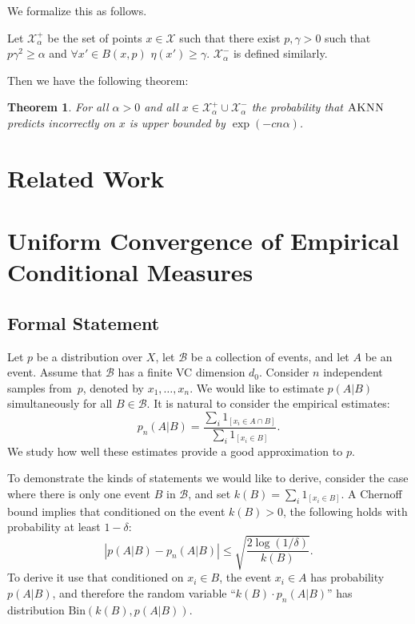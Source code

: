 \documentclass{article}
\def\X{{\mathcal X}}
\def\B{{\mathcal B}}
\newcommand{\cB}{\mathcal{B}}
\newcommand{\algname}{\textsc{AKNN}}
\newtheorem{theorem}{Theorem}
\begin{document}
We formalize this as follows.

Let $\X_{\alpha}^+$ be the set of points $x \in \X$ such that there exist $p,\gamma>0$ such that $p \gamma^2 \geq \alpha$ and  $\forall x' \in B(x,p)$ $\eta(x')\geq \gamma$. $\X_{\alpha}^-$ is defined similarly.

Then we have the following theorem:
\begin{theorem}\label{thm:fastrate}
For all $\alpha>0$ and all $x \in \X_{\alpha}^+ \cup \X_{\alpha}^-$ the probability that $\algname$ predicts incorrectly on $x$ is upper bounded by $\exp(-c n \alpha)$.
\end{theorem}


\section{Related Work}




\section{Uniform Convergence of Empirical Conditional Measures}
\label{sec:ucecm}


\subsection{Formal Statement}

Let $p$ be a distribution over $X$, let $\cB$ be a collection of events, and let $A$ be an event.
Assume that $\cB$ has a finite VC dimension $d_0$.
Consider $n$ independent samples from~$p$, denoted by $x_1,\ldots,x_n$.
We would like to estimate $p(A \vert B)$ simultaneously for all $B\in \B$.
It is natural to consider the empirical estimates:
\[p_n(A\vert B)=\frac{\sum_i 1_{[x_i\in A \cap B]}}{\sum_i 1_{[x_i\in B]}}.\]
We study how well these estimates provide a good approximation to $p$.

To demonstrate the kinds of statements we would like to derive,
consider the case where there is only one event $B$ in $\cB$, 
and set $k(B)=\sum_i 1_{[x_i\in B]}$.
A Chernoff bound implies that conditioned on the event $k(B)>0$, 
the following holds with probability at least $1-\delta$:
\begin{equation}\label{eq:chernoff}
\left\lvert p(A\vert B) - p_n(A \vert B) \right\rvert \leq \sqrt{\frac{2\log(1/\delta)}{k(B)}}.
\end{equation}
To derive it use that conditioned on $x_i\in B$, the event $x_i\in A$ has probability $p(A\vert B)$, 
and therefore the random variable ``$k(B)\cdot p_n(A \vert B)$'' has distribution $\mbox{Bin}(k(B), p(A\vert B))$.
\end{document}
